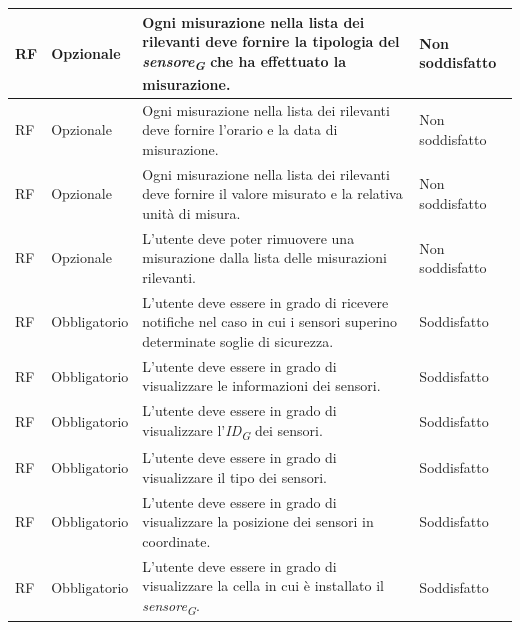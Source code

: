 \begin{longtable}{|C{1.5cm}|C{2cm}|L{5cm}|C{2cm}|}
    \hline
     RF & Opzionale & Ogni misurazione nella lista dei rilevanti deve fornire la tipologia del \textit{sensore}\textsubscript{\textit{G}} che ha effettuato la misurazione.& Non soddisfatto \\

    \hline
     RF & Opzionale & Ogni misurazione nella lista dei rilevanti deve fornire l'orario e la data di misurazione.& Non soddisfatto \\

    \hline
     RF & Opzionale & Ogni misurazione nella lista dei rilevanti deve fornire il valore misurato e la relativa unità di misura.& Non soddisfatto \\

    \hline
     RF & Opzionale & L'utente deve poter rimuovere una misurazione dalla lista delle misurazioni rilevanti.& Non soddisfatto \\

    \hline
     RF & Obbligatorio & L'utente deve essere in grado di ricevere notifiche nel caso in cui i sensori superino determinate soglie di sicurezza.& Soddisfatto \\

    \hline
     RF & Obbligatorio & L'utente deve essere in grado di visualizzare le informazioni dei sensori.& Soddisfatto \\

    \hline
     RF & Obbligatorio & L'utente deve essere in grado di visualizzare l'\textit{ID}\textsubscript{\textit{G}} dei sensori.& Soddisfatto \\

    \hline
     RF & Obbligatorio & L'utente deve essere in grado di visualizzare il tipo dei sensori.& Soddisfatto \\

    \hline
     RF & Obbligatorio & L'utente deve essere in grado di visualizzare la posizione dei sensori in coordinate.& Soddisfatto \\

    \hline
     RF & Obbligatorio & L'utente deve essere in grado di visualizzare la cella in cui è installato il \textit{sensore}\textsubscript{\textit{G}}.& Soddisfatto \\


\end{longtable}

